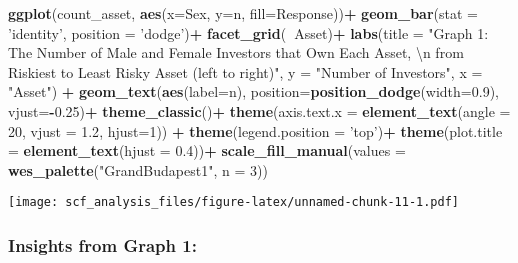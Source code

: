 \documentclass[
]{article}
\newenvironment{Shaded}{\begin{snugshade}}{\end{snugshade}}
\newcommand{\CharTok}[1]{\textcolor[rgb]{0.31,0.60,0.02}{#1}}
\newcommand{\DataTypeTok}[1]{\textcolor[rgb]{0.13,0.29,0.53}{#1}}
\newcommand{\DecValTok}[1]{\textcolor[rgb]{0.00,0.00,0.81}{#1}}
\newcommand{\FloatTok}[1]{\textcolor[rgb]{0.00,0.00,0.81}{#1}}
\newcommand{\KeywordTok}[1]{\textcolor[rgb]{0.13,0.29,0.53}{\textbf{#1}}}
\newcommand{\NormalTok}[1]{#1}
\newcommand{\OperatorTok}[1]{\textcolor[rgb]{0.81,0.36,0.00}{\textbf{#1}}}
\newcommand{\StringTok}[1]{\textcolor[rgb]{0.31,0.60,0.02}{#1}}
\begin{document}
\begin{Shaded}
\begin{Highlighting}[]
\KeywordTok{ggplot}\NormalTok{(count_asset, }\KeywordTok{aes}\NormalTok{(}\DataTypeTok{x=}\NormalTok{Sex, }\DataTypeTok{y=}\NormalTok{n, }\DataTypeTok{fill=}\NormalTok{Response))}\OperatorTok{+}
\StringTok{  }\KeywordTok{geom_bar}\NormalTok{(}\DataTypeTok{stat =} \StringTok{'identity'}\NormalTok{, }\DataTypeTok{position =} \StringTok{'dodge'}\NormalTok{)}\OperatorTok{+}
\StringTok{  }\KeywordTok{facet_grid}\NormalTok{(}\OperatorTok{~}\NormalTok{Asset)}\OperatorTok{+}
\StringTok{  }\KeywordTok{labs}\NormalTok{(}\DataTypeTok{title =} \StringTok{"Graph 1: The Number of Male and Female Investors that Own Each Asset, }\CharTok{\textbackslash{}n}\StringTok{   from Riskiest to Least Risky Asset (left to right)"}\NormalTok{, }\DataTypeTok{y =} \StringTok{"Number of Investors"}\NormalTok{, }\DataTypeTok{x =} \StringTok{"Asset"}\NormalTok{) }\OperatorTok{+}
\StringTok{  }\KeywordTok{geom_text}\NormalTok{(}\KeywordTok{aes}\NormalTok{(}\DataTypeTok{label=}\NormalTok{n), }\DataTypeTok{position=}\KeywordTok{position_dodge}\NormalTok{(}\DataTypeTok{width=}\FloatTok{0.9}\NormalTok{), }\DataTypeTok{vjust=}\OperatorTok{-}\FloatTok{0.25}\NormalTok{)}\OperatorTok{+}
\StringTok{  }\KeywordTok{theme_classic}\NormalTok{()}\OperatorTok{+}
\StringTok{  }\KeywordTok{theme}\NormalTok{(}\DataTypeTok{axis.text.x =} \KeywordTok{element_text}\NormalTok{(}\DataTypeTok{angle =} \DecValTok{20}\NormalTok{, }\DataTypeTok{vjust =} \FloatTok{1.2}\NormalTok{, }\DataTypeTok{hjust=}\DecValTok{1}\NormalTok{)) }\OperatorTok{+}
\StringTok{  }\KeywordTok{theme}\NormalTok{(}\DataTypeTok{legend.position =} \StringTok{'top'}\NormalTok{)}\OperatorTok{+}
\StringTok{  }\KeywordTok{theme}\NormalTok{(}\DataTypeTok{plot.title =} \KeywordTok{element_text}\NormalTok{(}\DataTypeTok{hjust =} \FloatTok{0.4}\NormalTok{))}\OperatorTok{+}
\StringTok{  }\KeywordTok{scale_fill_manual}\NormalTok{(}\DataTypeTok{values =} \KeywordTok{wes_palette}\NormalTok{(}\StringTok{"GrandBudapest1"}\NormalTok{, }\DataTypeTok{n =} \DecValTok{3}\NormalTok{))}
\end{Highlighting}
\end{Shaded}

\texttt{[image: scf\_analysis\_files/figure-latex/unnamed-chunk-11-1.pdf]}

\hypertarget{insights-from-graph-1}{%
\subsubsection{Insights from Graph 1:}\label{insights-from-graph-1}}
\end{document}

